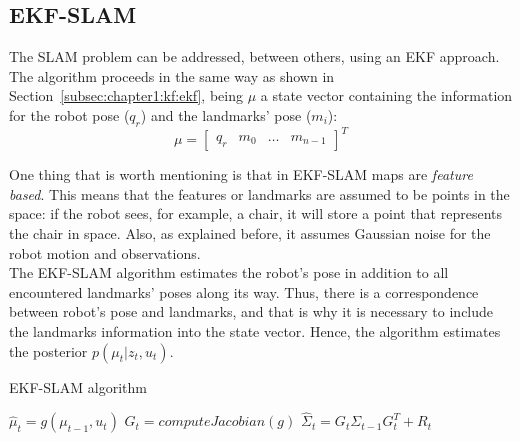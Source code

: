 \subsection{EKF-SLAM}
\label{subsec:chapter1:slam:ekfslam}
The \ac{SLAM} problem can be addressed, between others, using an \ac{EKF} approach. The algorithm proceeds in the same way as shown in Section~\ref{subsec:chapter1:kf:ekf}, being $\mu$ a state vector containing the information for the robot pose ($q_r$) and the landmarks' pose ($m_i$):
\begin{equation}
    \mu = \begin{bmatrix}
        q_r & m_0 & \dots & m_{n-1}
    \end{bmatrix}^T
\end{equation}

One thing that is worth mentioning is that in EKF-SLAM maps are \emph{feature based}. This means that the features or landmarks are assumed to be points in the space: if the robot sees, for example, a chair, it will store a point that represents the chair in space. Also, as explained before, it assumes Gaussian noise for the robot motion and observations.\\

The EKF-SLAM algorithm estimates the robot's pose in addition to all encountered landmarks' poses along its way. Thus, there is a correspondence between robot's pose and landmarks, and that is why it is necessary to include the landmarks information into the state vector. Hence, the algorithm estimates the posterior $p\left(\mu_t | z_t, u_t\right)$.\\

\begin{algorithm}[h]
    \caption{EKF-SLAM algorithm}
    \label{alg:chapter1:slam:ekfslam}
    \BlankLine
    \BlankLine
    $\hat\mu_t = g\left(\mu_{t-1}, u_t\right)$\;
    $G_t = computeJacobian\left(g\right)$\;
    $\hat\Sigma_t = G_t \Sigma_{t-1} G_t^T + R_t$\;
    \BlankLine
    \BlankLine
\end{algorithm}

